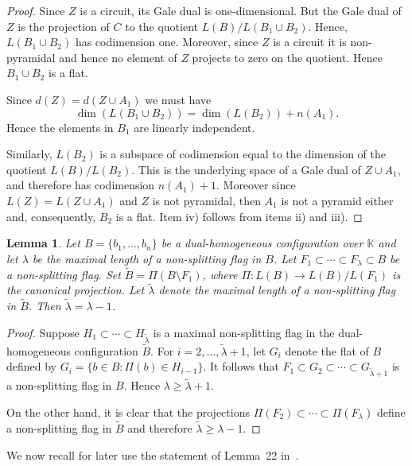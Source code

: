 \documentclass[11pt]{amsart}
\theoremstyle{plain}
\newtheorem{lemma}[theorem]{Lemma}
\theoremstyle{definition}
\theoremstyle{remark}
\renewcommand{\k}{{\mathbb K}}
\numberwithin{equation}{section}
\begin{document}
\begin{proof} Since $Z$ is a circuit, its Gale dual is one-dimensional.  But the Gale dual of $Z$ is the projection of $C$ to the quotient
$L(B)/L(B_1 \cup B_2)$.  Hence, $L(B_1 \cup B_2)$ has codimension one.  
Moreover, since $Z$ is a circuit it is non-pyramidal and hence no element of $Z$ projects to zero on the quotient.  Hence 
$B_1 \cup B_2$ is a flat.

Since $d(Z) = d(Z \cup A_1)$ we must have 
$$\dim(L(B_1 \cup B_2)) = \dim(L(B_2)) + n(A_1).$$
Hence the elements in $B_1$ are linearly independent.

Similarly, $L(B_2)$ is a subspace of codimension
equal to the dimension of the quotient $ L(B) / L(B_2)$. This is the underlying space of a 
Gale dual of $ Z \cup A_1$, and therefore has codimension $n(A_1)+1$.  Moreover since 
$L(Z) = L(Z \cup A_1)$ and $Z$ is not pyramidal, then $A_1$ is not a pyramid either and, consequently, $B_2$ is a flat.
Item iv) follows from items ii) and iii). 
\end{proof}

\begin{lemma}\label{quotient-flag}
Let $B =\{b_1, \dots, b_n\}$ be a dual-homogeneous  configuration over $\k$  
and let $\lambda$ be the maximal length of a non-splitting flag in $B$.  Let 
$F_1 \subset \cdots \subset F_{\lambda} \subset B$
be a non-splitting flag.  
Set 
$\tilde{B}= \Pi(B \setminus F_1)$,
where $\Pi \colon L(B) \to L(B) / L(F_1) $ is the canonical projection. 
Let $\tilde \lambda$ denote the maximal length of a non-splitting flag in $\tilde B$.
Then 
$\tilde \lambda = \lambda -1$.
\end{lemma}

\begin{proof}  
Suppose 
$H_1 \subset \cdots \subset H_{\tilde\lambda}$
is a maximal non-splitting flag in the dual-homo\-ge\-neous configuration $\tilde{B}$.  For $i=2,\dots,\tilde\lambda+1$, let 
$G_i$ denote the flat of $B$ defined by 
$G_i =\{b\in B : \Pi(b) \in H_{i-1}\}$.
It follows that
$F_1 \subset G_2 \subset \cdots \subset G_{\tilde \lambda + 1}$ 
is a non-splitting flag in $B$.  Hence 
$\lambda \geq \tilde\lambda+1$.

On the other hand, it is clear that the projections
$\Pi(F_2) \subset \cdots \subset \Pi(F_\lambda)$
define a non-splitting flag in $\tilde{B}$ and therefore 
$\tilde \lambda \geq \lambda -1$.
\end{proof}

We now recall for later use the statement of Lemma~22  in~\cite{CC}.
\end{document}
